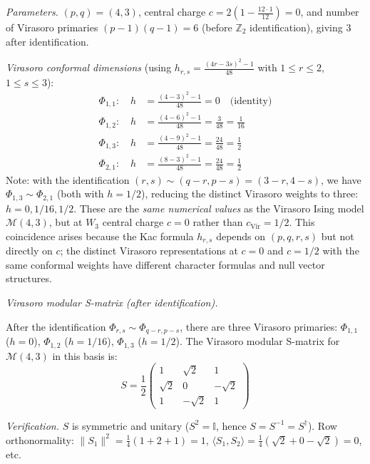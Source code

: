 \begin{example}\label{ex:w3-3-4-complete}

\emph{Parameters.}
$(p,q) = (4,3)$, central charge $c = 2(1 - \frac{12 \cdot 1}{12}) = 0$, and number of Virasoro primaries $(p-1)(q-1) = 6$ (before $\mathbb{Z}_2$ identification), giving 3 after identification.

\emph{Virasoro conformal dimensions} (using $h_{r,s} = \frac{(4r-3s)^2-1}{48}$ with $1 \leq r \leq 2$, $1 \leq s \leq 3$):
\begin{align}
\Phi_{1,1}: \quad h &= \frac{(4-3)^2 - 1}{48} = 0 \quad \text{(identity)} \\
\Phi_{1,2}: \quad h &= \frac{(4-6)^2 - 1}{48} = \frac{3}{48} = \frac{1}{16} \\
\Phi_{1,3}: \quad h &= \frac{(4-9)^2 - 1}{48} = \frac{24}{48} = \frac{1}{2} \\
\Phi_{2,1}: \quad h &= \frac{(8-3)^2 - 1}{48} = \frac{24}{48} = \frac{1}{2}
\end{align}
Note: with the identification $(r,s) \sim (q-r, p-s) = (3-r, 4-s)$, we have $\Phi_{1,3} \sim \Phi_{2,1}$ (both with $h = 1/2$), reducing the distinct Virasoro weights to three: $h = 0, 1/16, 1/2$. These are the \emph{same numerical values} as the Virasoro Ising model $\mathcal{M}(4,3)$, but at $W_3$ central charge $c = 0$ rather than $c_{\text{Vir}} = 1/2$. This coincidence arises because the Kac formula $h_{r,s}$ depends on $(p,q,r,s)$ but not directly on $c$; the distinct Virasoro representations at $c = 0$ and $c = 1/2$ with the same conformal weights have different character formulas and null vector structures.

\emph{Virasoro modular S-matrix (after identification).}

After the identification $\Phi_{r,s} \sim \Phi_{q-r,p-s}$, there are three Virasoro primaries: $\Phi_{1,1}$ ($h=0$), $\Phi_{1,2}$ ($h=1/16$), $\Phi_{1,3}$ ($h=1/2$).  The Virasoro modular S-matrix for $\mathcal{M}(4,3)$ in this basis is:
\begin{equation}
S = \frac{1}{2}\begin{pmatrix}
1 & \sqrt{2} & 1 \\
\sqrt{2} & 0 & -\sqrt{2} \\
1 & -\sqrt{2} & 1
\end{pmatrix}
\end{equation}

\emph{Verification.} $S$ is symmetric and unitary ($S^2 = \mathbb{I}$, hence $S = S^{-1} = S^\dagger$).  Row orthonormality: $\|S_1\|^2 = \frac{1}{4}(1+2+1)=1$, $\langle S_1, S_2\rangle = \frac{1}{4}(\sqrt{2}+0-\sqrt{2})=0$, etc.
\end{example}

